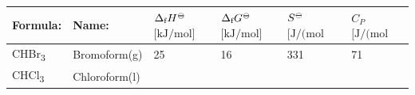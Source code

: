 \documentclass[
  9pt,
]{extbook}
\theoremstyle{definition}
\theoremstyle{definition}
\theoremstyle{definition}
\theoremstyle{remark}
\begin{document}
\begin{longtable}[]{@{}llllll@{}}
\toprule
\begin{minipage}[b]{0.07\columnwidth}\raggedright
Formula:\strut
\end{minipage} & \begin{minipage}[b]{0.17\columnwidth}\raggedright
Name:\strut
\end{minipage} & \begin{minipage}[b]{0.15\columnwidth}\raggedright
\(\Delta_{\text{f}} H^{-\kern-6pt{\ominus}\kern-6pt-}\)
\(\scriptstyle{\text{[kJ/mol]}}\)\strut
\end{minipage} & \begin{minipage}[b]{0.15\columnwidth}\raggedright
\(\Delta_{\text{f}} G^{-\kern-6pt{\ominus}\kern-6pt-}\)
\(\scriptstyle{\text{[kJ/mol]}}\)\strut
\end{minipage} & \begin{minipage}[b]{0.14\columnwidth}\raggedright
\(S^{-\kern-6pt{\ominus}\kern-6pt-}\)
\(\scriptstyle{\text{[J/(mol K)]}}\)\strut
\end{minipage} & \begin{minipage}[b]{0.14\columnwidth}\raggedright
\(C_P\)
\(\scriptstyle{\text{[J/(mol K)]}}\)\strut
\end{minipage}\tabularnewline
\midrule
\endhead
\begin{minipage}[t]{0.07\columnwidth}\raggedright
CHBr\textsubscript{3}\strut
\end{minipage} & \begin{minipage}[t]{0.17\columnwidth}\raggedright
Bromoform(g)\strut
\end{minipage} & \begin{minipage}[t]{0.15\columnwidth}\raggedright
25\strut
\end{minipage} & \begin{minipage}[t]{0.15\columnwidth}\raggedright
16\strut
\end{minipage} & \begin{minipage}[t]{0.14\columnwidth}\raggedright
331\strut
\end{minipage} & \begin{minipage}[t]{0.14\columnwidth}\raggedright
71\strut
\end{minipage}\tabularnewline
\begin{minipage}[t]{0.07\columnwidth}\raggedright
CHCl\textsubscript{3}\strut
\end{minipage} & \begin{minipage}[t]{0.17\columnwidth}\raggedright
Chloroform(l)\strut

\end{minipage}
\end{longtable}
\end{document}
